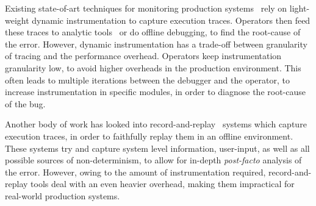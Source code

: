 Existing state-of-art techniques for monitoring production systems~\cite{dtrace, iProbe, winetw} rely on light-weight dynamic instrumentation to capture execution traces. 
Operators then feed these traces to analytic tools~\cite{magpie,clue} or do offline debugging, to find the root-cause of the error.
However, dynamic instrumentation has a trade-off between granularity of tracing and the performance overhead. 
Operators keep instrumentation granularity low, to avoid higher overheads in the production environment.
This often leads to multiple iterations between the debugger and the operator, to increase instrumentation in specific modules, in order to diagnose the root-cause of the bug. 

Another body of work has looked into record-and-replay~\cite{odr,revirt,laadan2010transparent,geels2007friday} systems which capture execution traces, in order to faithfully replay them in an offline environment.
These systems try and capture system level information, user-input, as well as all possible sources of non-determinism, to allow for in-depth \textit{post-facto} analysis of the error.
However, owing to the amount of instrumentation required, record-and-replay tools deal with an even heavier overhead, making them impractical for real-world production systems.


